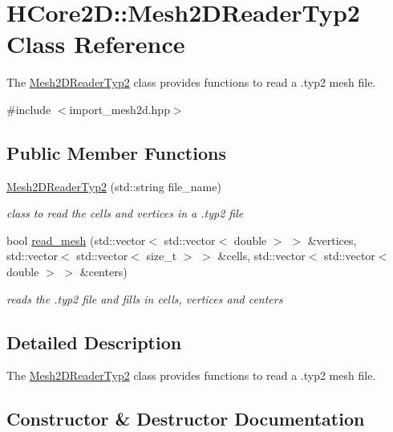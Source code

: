 \hypertarget{classHCore2D_1_1Mesh2DReaderTyp2}{}\section{H\+Core2D\+:\+:Mesh2\+D\+Reader\+Typ2 Class Reference}
\label{classHCore2D_1_1Mesh2DReaderTyp2}


The \hyperlink{classHCore2D_1_1Mesh2DReaderTyp2}{Mesh2\+D\+Reader\+Typ2} class provides functions to read a .typ2 mesh file.  




{\ttfamily \#include $<$import\+\_\+mesh2d.\+hpp$>$}

\subsection*{Public Member Functions}
\begin{DoxyCompactItemize}
\item 
\hyperlink{classHCore2D_1_1Mesh2DReaderTyp2_a7a45023236b7fb6d1d56a21d16c345f3}{Mesh2\+D\+Reader\+Typ2} (std\+::string file\+\_\+name)
\begin{DoxyCompactList}\small\item\em class to read the cells and vertices in a .typ2 file \end{DoxyCompactList}\item 
bool \hyperlink{classHCore2D_1_1Mesh2DReaderTyp2_a7ae7c26bf4242e528e1a7c6a0f3dce07}{read\+\_\+mesh} (std\+::vector$<$ std\+::vector$<$ double $>$ $>$ \&vertices, std\+::vector$<$ std\+::vector$<$ size\+\_\+t $>$ $>$ \&cells, std\+::vector$<$ std\+::vector$<$ double $>$ $>$ \&centers)
\begin{DoxyCompactList}\small\item\em reads the .typ2 file and fills in cells, vertices and centers \end{DoxyCompactList}\end{DoxyCompactItemize}


\subsection{Detailed Description}
The \hyperlink{classHCore2D_1_1Mesh2DReaderTyp2}{Mesh2\+D\+Reader\+Typ2} class provides functions to read a .typ2 mesh file. 

\subsection{Constructor \& Destructor Documentation}
\mbox{\label{classHCore2D_1_1Mesh2DReaderTyp2_a7a45023236b7fb6d1d56a21d16c345f3}} 
